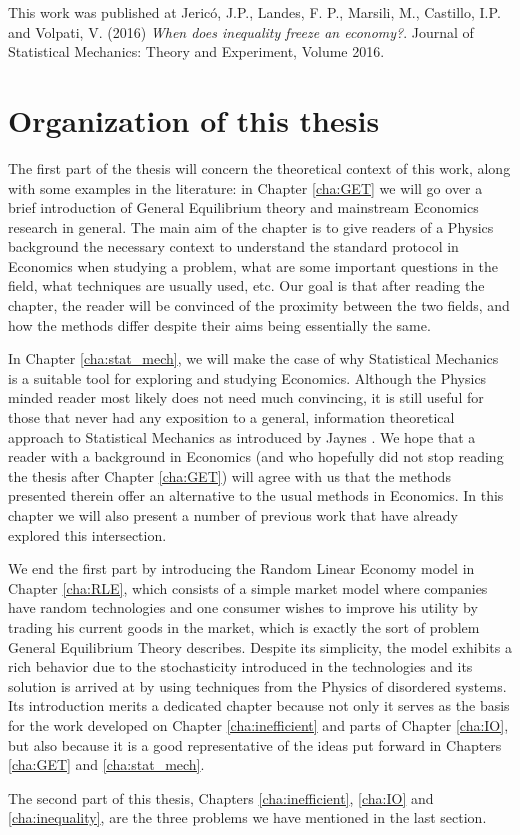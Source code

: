 This work was published at Jericó, J.P., Landes, F. P., Marsili, M., Castillo, I.P. and Volpati, V. (2016) \emph{When does inequality freeze an economy?}. Journal of Statistical Mechanics: Theory and Experiment, Volume 2016.



\section{Organization of this thesis}

The first part of the thesis will concern the theoretical context of this work, along with some examples in the literature: in Chapter \ref{cha:GET} we will go over a brief introduction of General Equilibrium theory and mainstream Economics research in general. The main aim of the chapter is to give readers of a Physics background the necessary context to understand the standard protocol in Economics when studying a problem, what are some important questions in the field, what techniques are usually used, etc. Our goal is that after reading the chapter, the reader will be convinced of the proximity between the two fields, and how the methods differ despite their aims being essentially the same. 

In Chapter \ref{cha:stat_mech}, we will make the case of why Statistical Mechanics is a suitable tool for exploring and studying Economics. Although the Physics minded reader most likely does not need much convincing, it is still useful for those that never had any exposition to a general, information theoretical approach to Statistical Mechanics as introduced by Jaynes \cite{Jaynes57}. We hope that a reader with a background in Economics (and who hopefully did not stop reading the thesis after Chapter \ref{cha:GET}) will agree with us that the methods presented therein offer an alternative to the usual methods in Economics. In this chapter we will also present a number of previous work that have already explored this intersection.

We end the first part by introducing the Random Linear Economy model in Chapter \ref{cha:RLE}, which consists of a simple market model where companies have random technologies and one consumer wishes to improve his utility by trading his current goods in the market, which is exactly the sort of problem General Equilibrium Theory describes. Despite its simplicity, the model exhibits a rich behavior due to the stochasticity introduced in the technologies and its solution is arrived at by using techniques from the Physics of disordered systems. Its introduction merits a dedicated chapter because not only it serves as the basis for the work developed on Chapter \ref{cha:inefficient} and parts of Chapter \ref{cha:IO}, but also because it is a good representative of the ideas put forward in Chapters \ref{cha:GET} and \ref{cha:stat_mech}.

The second part of this thesis, Chapters \ref{cha:inefficient}, \ref{cha:IO} and \ref{cha:inequality}, are the three problems we have mentioned in the last section. 
